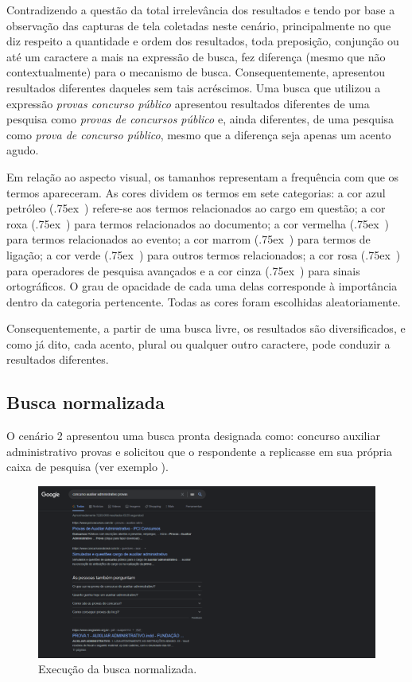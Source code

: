 \documentclass[portuguese]{textolivre}
\begin{document}
Contradizendo a questão da total irrelevância dos resultados e tendo por base a observação das capturas de tela coletadas neste cenário, principalmente no que diz respeito a quantidade e ordem dos resultados, toda preposição, conjunção ou até um caractere a mais na expressão de busca, fez diferença (mesmo que não contextualmente) para o mecanismo de busca. Consequentemente, apresentou resultados diferentes daqueles sem tais acréscimos. Uma busca que utilizou a expressão \textit{provas concurso público} apresentou resultados diferentes de uma pesquisa como \textit{provas de concursos público} e, ainda diferentes, de uma pesquisa como \textit{prova de concurso público}, mesmo que a diferença seja apenas um acento agudo.

Em relação ao aspecto visual, os tamanhos representam a frequência com que os termos apareceram. As cores dividem os termos em sete categorias: a cor azul petróleo (\raise.75ex\hbox{\colorbox{teal!70}{   }}) refere-se aos termos relacionados ao cargo em questão; a cor roxa (\raise.75ex\hbox{\colorbox{violet!70}{   }}) para termos relacionados ao documento; a cor vermelha (\raise.75ex\hbox{\colorbox{red!70}{   }}) para termos relacionados ao evento; a cor marrom (\raise.75ex\hbox{\colorbox{brown!100!}{   }}) para termos de ligação; a cor verde (\raise.75ex\hbox{\colorbox{blue!20!black!30!green}{   }}) para outros termos relacionados; a cor rosa (\raise.75ex\hbox{\colorbox{magenta!70}{   }})  para operadores de pesquisa avançados e a cor cinza (\raise.75ex\hbox{\colorbox{gray!70}{   }}) para sinais ortográficos. O grau de opacidade de cada uma delas corresponde à importância dentro da categoria pertencente. Todas as cores foram escolhidas aleatoriamente.

Consequentemente, a partir de uma busca livre, os resultados são diversificados, e como já dito, cada acento, plural ou qualquer outro caractere, pode conduzir a resultados diferentes.

\subsection{Busca normalizada}\label{sec-resumo}
O cenário 2 apresentou uma busca pronta designada como: concurso auxiliar administrativo provas e solicitou que o respondente a replicasse em sua própria caixa de pesquisa (ver exemplo ).

\begin{figure}[h!]
    \centering
    \includegraphics[width=0.8\linewidth]{fig-011.png}
    \caption{Execução da busca normalizada.}
    \label{fig15}
\end{figure}
\end{document}
